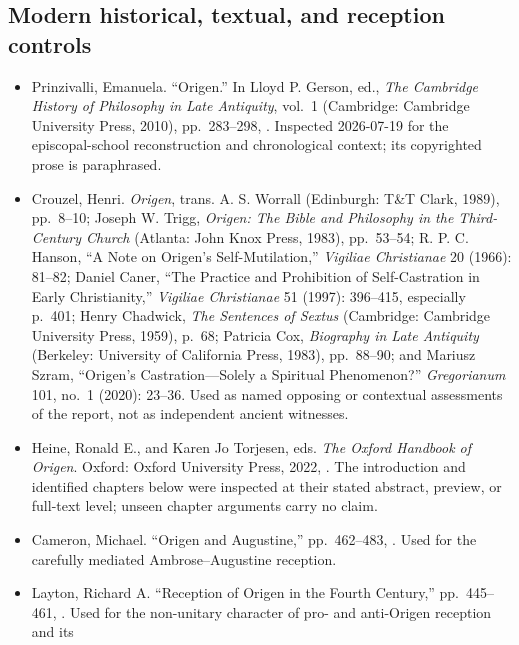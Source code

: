 \subsection{Modern historical, textual, and reception controls}

\begin{itemize}
\item Prinzivalli, Emanuela. ``Origen.'' In Lloyd P. Gerson, ed., \emph{The
Cambridge History of Philosophy in Late Antiquity}, vol.~1 (Cambridge:
Cambridge University Press, 2010), pp.~283--298,
.
Inspected 2026-07-19 for the episcopal-school reconstruction and chronological
context; its copyrighted prose is paraphrased.
\item Crouzel, Henri. \emph{Origen}, trans. A. S. Worrall (Edinburgh: T\&T
Clark, 1989), pp.~8--10; Joseph W. Trigg, \emph{Origen: The Bible and
Philosophy in the Third-Century Church} (Atlanta: John Knox Press, 1983),
pp.~53--54; R. P. C. Hanson, ``A Note on Origen's Self-Mutilation,''
\emph{Vigiliae Christianae} 20 (1966): 81--82; Daniel Caner, ``The Practice
and Prohibition of Self-Castration in Early Christianity,'' \emph{Vigiliae
Christianae} 51 (1997): 396--415, especially p.~401; Henry Chadwick,
\emph{The Sentences of Sextus} (Cambridge: Cambridge University Press, 1959),
p.~68; Patricia Cox, \emph{Biography in Late Antiquity} (Berkeley: University
of California Press, 1983), pp.~88--90; and Mariusz Szram, ``Origen's
Castration---Solely a Spiritual Phenomenon?'' \emph{Gregorianum} 101, no.~1
(2020): 23--36. Used as named opposing or contextual assessments of the report,
not as independent ancient witnesses.
\item Heine, Ronald E., and Karen Jo Torjesen, eds. \emph{The Oxford Handbook
of Origen}. Oxford: Oxford University Press, 2022,
.
The introduction and identified chapters below were inspected at their stated
abstract, preview, or full-text level; unseen chapter arguments carry no claim.
\item Cameron, Michael. ``Origen and Augustine,'' pp.~462--483,
.
Used for the carefully mediated Ambrose--Augustine reception.
\item Layton, Richard A. ``Reception of Origen in the Fourth Century,''
pp.~445--461,
.
Used for the non-unitary character of pro- and anti-Origen reception and its

\end{itemize}
